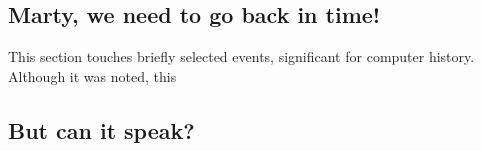 \documentclass{article}
\begin{document}

            \newpage
        \subsection{Marty, we need to go back in time!}
            
            This section touches briefly selected events, significant for computer history. Although it was noted, this 




            \newpage
        \subsection{But can it speak?}
            \newpage

    
\end{document}
